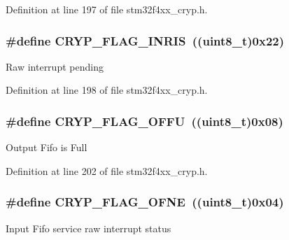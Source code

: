 Definition at line 197 of file stm32f4xx\-\_\-cryp.\-h.

\hypertarget{group___c_r_y_p__flags__definition_gae78eb0d13fa041688f4b33479b632232}{
\subsubsection[{C\-R\-Y\-P\-\_\-\-F\-L\-A\-G\-\_\-\-I\-N\-R\-I\-S}]{\setlength{\rightskip}{0pt plus 5cm}\#define C\-R\-Y\-P\-\_\-\-F\-L\-A\-G\-\_\-\-I\-N\-R\-I\-S~((uint8\-\_\-t)0x22)}}\label{group___c_r_y_p__flags__definition_gae78eb0d13fa041688f4b33479b632232}
Raw interrupt pending 

Definition at line 198 of file stm32f4xx\-\_\-cryp.\-h.

\hypertarget{group___c_r_y_p__flags__definition_ga6dd1f9ebfe8658ade0855f34607e0a6b}{
\subsubsection[{C\-R\-Y\-P\-\_\-\-F\-L\-A\-G\-\_\-\-O\-F\-F\-U}]{\setlength{\rightskip}{0pt plus 5cm}\#define C\-R\-Y\-P\-\_\-\-F\-L\-A\-G\-\_\-\-O\-F\-F\-U~((uint8\-\_\-t)0x08)}}\label{group___c_r_y_p__flags__definition_ga6dd1f9ebfe8658ade0855f34607e0a6b}
Output Fifo is Full 

Definition at line 202 of file stm32f4xx\-\_\-cryp.\-h.

\hypertarget{group___c_r_y_p__flags__definition_gaa0810704152c5810a2461acdec0cf13d}{
\subsubsection[{C\-R\-Y\-P\-\_\-\-F\-L\-A\-G\-\_\-\-O\-F\-N\-E}]{\setlength{\rightskip}{0pt plus 5cm}\#define C\-R\-Y\-P\-\_\-\-F\-L\-A\-G\-\_\-\-O\-F\-N\-E~((uint8\-\_\-t)0x04)}}\label{group___c_r_y_p__flags__definition_gaa0810704152c5810a2461acdec0cf13d}
Input Fifo service raw interrupt status 

